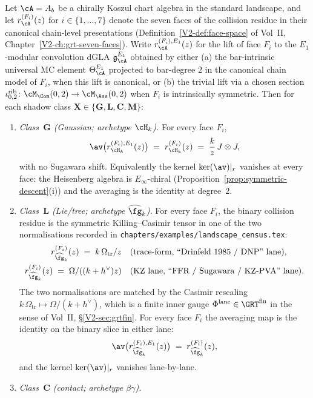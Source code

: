 \begin{proposition}
Let $\cA = A_b$ be a chirally Koszul chart algebra in the standard
landscape, and let $r_\cA^{(F_i)}(z)$ for $i \in \{1,\dots,7\}$
denote the seven faces of the collision residue in their
canonical chain-level presentations
(Definition~\ref{V2-def:face-space} of Vol~II,
Chapter~\ref{V2-ch:grt-seven-faces}). Write
$r_\cA^{(F_i),E_1}(z)$ for the lift of face $F_i$ to the
$E_1$-modular convolution dGLA $\mathfrak{g}_\cA^{E_1}$ obtained
by either (a) the bar-intrinsic universal MC element
$\Theta_\cA^{E_1}$ projected to bar-degree $2$ in the canonical
chain model of $F_i$, when this lift is canonical, or (b) the
trivial lift via a chosen section
$\iota^{\mathrm{rib}}_{0,2}\colon \cM_\Com(0,2) \to
\cM_\Ass(0,2)$ when $F_i$ is intrinsically symmetric. Then for
each shadow class $\mathbf{X} \in \{\mathbf{G}, \mathbf{L},
\mathbf{C}, \mathbf{M}\}$:
\begin{enumerate}[label=\textup{(\roman*)}]
\item \emph{Class~$\mathbf{G}$ (Gaussian; archetype $\cH_k$).}
 For every face $F_i$,
 \[
 \av\bigl(r_{\cH_k}^{(F_i),E_1}(z)\bigr) \;=\;
 r_{\cH_k}^{(F_i)}(z) \;=\; \frac{k}{z}\, J\otimes J,
 \]
 with no Sugawara shift. Equivalently the kernel
 $\ker(\av)|_{r}$ vanishes at every face: the Heisenberg algebra
 is $E_\infty$-chiral
 (Proposition~\ref{prop:symmetric-descent}(i)) and the
 averaging is the identity at degree~$2$.
\item \emph{Class~$\mathbf{L}$ (Lie/tree; archetype
 $\widehat{\fg}_k$).} For every face $F_i$, the binary
 collision residue is the symmetric Killing--Casimir tensor in
 one of the two normalisations recorded in
 \texttt{chapters/examples/landscape\_census.tex}:
 \begin{align*}
 r_{\widehat{\fg}_k}^{(F_i)}(z) \;=\;
 k\,\Omega_{\mathrm{tr}}/z
 \quad &\text{(trace-form, ``Drinfeld 1985 / DNP'' lane),} \\
 r_{\widehat{\fg}_k}^{(F_i)}(z) \;=\;
 \Omega/((k+h^\vee)z)
 \quad &\text{(KZ lane, ``FFR / Sugawara / KZ-PVA'' lane).}
 \end{align*}
 The two normalisations are matched by the Casimir rescaling
 $k\,\Omega_{\mathrm{tr}}\mapsto
 \Omega/(k+h^\vee)$, which is a finite inner gauge
 $\Phi^{\mathrm{lane}} \in \GRT^{\mathrm{fin}}$ in the sense
 of Vol~II, \S\ref{V2-sec:grtfin}. For every face $F_i$ the
 averaging map is the identity on the binary slice in either
 lane:
 \[
 \av\bigl(r_{\widehat{\fg}_k}^{(F_i),E_1}(z)\bigr) \;=\;
 r_{\widehat{\fg}_k}^{(F_i)}(z),
 \]
 and the kernel $\ker(\av)|_r$ vanishes lane-by-lane.
\item \emph{Class~$\mathbf{C}$ (contact; archetype $\beta\gamma$).}

\end{enumerate}
\end{proposition}
